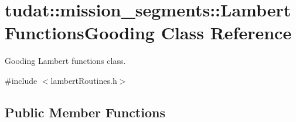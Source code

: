 \hypertarget{classtudat_1_1mission__segments_1_1LambertFunctionsGooding}{}\section{tudat\+:\+:mission\+\_\+segments\+:\+:Lambert\+Functions\+Gooding Class Reference}
\label{classtudat_1_1mission__segments_1_1LambertFunctionsGooding}


Gooding Lambert functions class.  




{\ttfamily \#include $<$lambert\+Routines.\+h$>$}

\subsection*{Public Member Functions}
